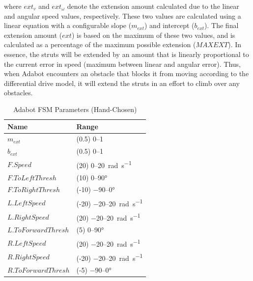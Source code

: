 \noindent
where $\mathit{ext}_v$ and $\mathit{ext}_\omega$ denote the extension amount calculated due to the linear and angular speed values, respectively. These two values are calculated using a linear equation with a configurable slope ($m_{\mathit{ext}}$) and intercept ($b_{\mathit{ext}}$).
%
The final extension amount ($\mathit{ext}$) is based on the maximum of these two values, and is calculated as a percentage of the maximum possible extension ($\mathit{MAXEXT}$).
%
In essence, the struts will be extended by an amount that is linearly proportional to the current error in speed (maximum between linear and angular error).
%
Thus, when Adabot encounters an obstacle that blocks it from moving according to the differential drive model, it will extend the struts in an effort to climb over any obstacles.


\begin{table}[thb]
    \centering
    \caption{Adabot FSM Parameters (Hand-Chosen)}
    \label{tbl:params-fsm}
    \begin{tabular}{@{}ll@{}}
        \toprule
        \textbf{Name} & \textbf{Range}\\
        \midrule
        $m_{\mathit{ext}}$ & (0.5) \numrange{0}{1}\\
        $b_{\mathit{ext}}$ & (0.5) \numrange{0}{1}\\
        $F.Speed$ & (20) \numrange{0}{20}~\si{\radian\per\second} \\
        $F.ToLeftThresh$ & (10) \numrange{0}{90}\si{\degree}\\
        $F.ToRightThresh$ & (-10) \numrange{-90}{0}\si{\degree}\\
        $L.LeftSpeed$ & (-20) \numrange{-20}{20}~\si{\radian\per\second} \\
        $L.RightSpeed$ & (20) \numrange{-20}{20}~\si{\radian\per\second} \\
        $L.ToForwardThresh$ & (5) \numrange{0}{90}\si{\degree}\\
        $R.LeftSpeed$ & (20) \numrange{-20}{20}~\si{\radian\per\second} \\
        $R.RightSpeed$ & (-20) \numrange{-20}{20}~\si{\radian\per\second} \\
        $R.ToForwardThresh$ & (-5) \numrange{-90}{0}\si{\degree}\\
        \bottomrule
    \end{tabular}
\end{table}



